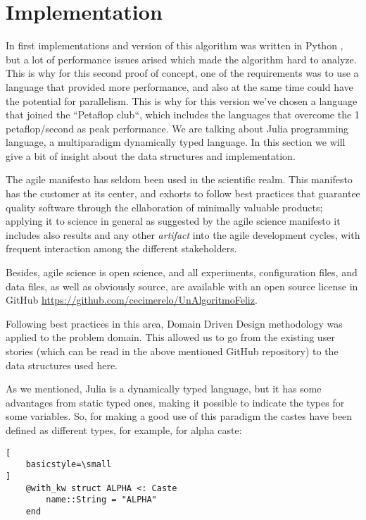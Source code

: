 \section{Implementation}

In first implementations and version of this algorithm was written in Python
\cite{merelo_molina_2021}, but a lot of performance issues arised which made the
algorithm hard to analyze. This is why for this second proof of concept, one of
the requirements was to use a language that provided more performance, and also
at the same time could have the potential for parallelism. This is why for this
version we've chosen a language that joined the ``Petaflop club``, which
includes the languages that overcome the 1 petaflop/second as peak
performance. We are talking about Julia \cite{julia} programming language, a
multiparadigm dynamically typed language. In this section we will give a bit of
insight about the data structures and implementation.

The agile manifesto has seldom been used in the scientific realm. This manifesto
has the customer at its center, and exhorts to follow best practices that
guarantee quality software through the ellaboration of minimally valuable
products; applying it to science in general as suggested by the agile science
manifesto \cite{agile_manifesto} it includes also results and any other {\em
  artifact} into the agile development cycles, with frequent interaction among
the different stakeholders.

Besides, agile science is open science, and all experiments, configuration
files, and data files, as well as obviously source, are available with an open
source license in GitHub \url{https://github.com/cecimerelo/UnAlgoritmoFeliz}.

Following best practices in this area, Domain Driven Design
\cite{evans2004domain} methodology was
applied to the problem domain. This allowed us to go from the existing user
stories (which can be read in the above mentioned GitHub repository) to the data
structures used here.

As we mentioned, Julia is a dynamically typed language, but it has some
advantages from static typed ones, making it possible to indicate the types for
some variables. So, for making a good use of this paradigm the castes have been
defined as different types, for example, for alpha caste:

\begin{lstlisting}[
    basicstyle=\small
]
    @with_kw struct ALPHA <: Caste
        name::String = "ALPHA"
    end
\end{lstlisting}

